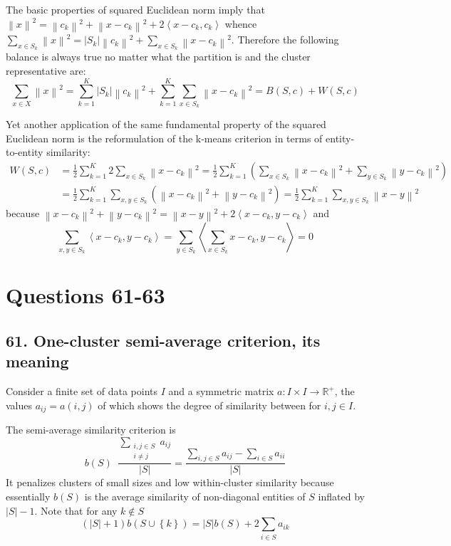 \documentclass[a4paper]{article}
\newcommand{\obj}[1]{{\left\{ #1 \right \}}}
\newcommand{\brac}[1]{{\left ( #1 \right )}}
\newcommand{\abs}[1]{{\left | #1 \right |}}
\newcommand{\nrm}[1]{{\left\| #1 \right \|}}
\newcommand{\brkt}[1]{{\left\langle #1 \right\rangle}}
\newcommand{\Real}{\mathbb{R}}
\newcommand{\defn}{\mathop{\overset{\Delta}{=}}\nolimits}
\begin{document}
The basic properties of squared Euclidean norm imply that $\nrm{x}^2 = \nrm{c_k}^2 + \nrm{x-c_k}^2 + 2\brkt{x-c_k,c_k}$ whence $\sum_{x\in S_k} \nrm{x}^2 = \abs{S_k} \nrm{c_k}^2 + \sum_{x\in S_k} \nrm{x-c_k}^2$. Therefore the following balance is always true no matter what the partition is and the cluster representative are: \[ \sum_{x\in X} \nrm{x}^2 = \sum_{k=1}^K \abs{S_k} \nrm{c_k}^2 + \sum_{k=1}^K \sum_{x\in S_k} \nrm{x-c_k}^2 = B\brac{S,c} + W\brac{S,c}\]

Yet another application of the same fundamental property of the squared Euclidean norm is the reformulation of the k-means criterion in terms of entity-to-entity similarity: \begin{align*}
	W\brac{S,c} &= \frac{1}{2} \sum_{k=1}^K 2 \sum_{x\in S_k} \nrm{x-c_k}^2 = \frac{1}{2}\sum_{k=1}^K \brac{ \sum_{x\in S_k} \nrm{x-c_k}^2 + \sum_{y\in S_k} \nrm{y-c_k}^2} \\&= \frac{1}{2}\sum_{k=1}^K \sum_{x,y\in S_k} \brac{ \nrm{x-c_k}^2 + \nrm{y-c_k}^2} = \frac{1}{2}\sum_{k=1}^K \sum_{x,y\in S_k} \nrm{x-y}^2
\end{align*}
because $\nrm{x-c_k}^2 + \nrm{y-c_k}^2 = \nrm{x-y}^2 + 2\brkt{x-c_k,y-c_k}$ and \[\sum_{x,y\in S_k} \brkt{x-c_k,y-c_k} = \sum_{y\in S_k} \brkt{\sum_{x\in S_k} x-c_k, y-c_k} = 0\]



\section*{Questions 61-63} %
\label{sec:questions_61_63}

\subsection*{61. One-cluster semi-average criterion, its meaning} %
\label{sub:question_61}
\noindent Consider a finite set of data points $I$ and a symmetric matrix $a:I\times I \to \Real^+$, the values $a_{ij} = a(i,j)$ of which shows the degree of similarity between for $i,j\in I$.

The semi-average similarity criterion is \[b(S) \defn \frac{\sum_{\substack{i,j\in S\\i\neq j}} a_{ij}}{\abs{S}} = \frac{\sum_{i,j\in S} a_{ij} - \sum_{i\in S} a_{ii} }{\abs{S}}\] It penalizes clusters of small sizes and low within-cluster similarity because essentially $b(S)$ is the average similarity of non-diagonal entities of $S$ inflated by $\abs{S}-1$. Note that for any $k\notin S$ \[\brac{\abs{S}+1} b\brac{S\cup\obj{k}} = \abs{S} b(S) + 2 \sum_{i\in S} a_{ik}\]
\end{document}

